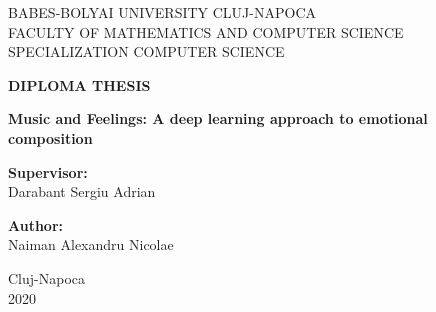 \begin{titlepage}
    \begin{center}

        \large
        {BABES-BOLYAI UNIVERSITY CLUJ-NAPOCA\\
            \vspace{0.5cm}
            FACULTY OF MATHEMATICS AND COMPUTER SCIENCE\\
            \vspace{0.5cm}
            SPECIALIZATION COMPUTER SCIENCE}

        \vfill


        \Large
        \textbf{DIPLOMA THESIS}

        \vspace{0.5cm}
        \Large
        \textbf{Music and Feelings: A deep learning approach to emotional composition}

        \vfill

        \begin{justify}
            \textbf{Supervisor:\\}
            Darabant Sergiu Adrian
        \end{justify}

        \vspace{0.8cm}

        \begin{flushright}
            \textbf{Author:\\}
            Naiman Alexandru Nicolae
        \end{flushright}

        \vspace{2cm}


        Cluj-Napoca\\
        2020

    \end{center}
\end{titlepage}
